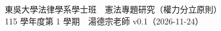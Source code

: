 \documentclass[11pt,oneside,openany]{book}
\newcommand{\documentversion}{v0.1（2026-11-24）}
\begin{document}
\frontmatter
{}%
  {東吳大學法律學系學士班　憲法專題研究（權力分立原則）\\115 學年度第 1 學期　湯德宗老師}%
  {\documentversion}
\tableofcontents
\mainmatter



\backmatter
\printbibliography[heading=bibintoc,title=參考文獻]
\end{document}
